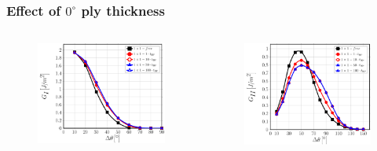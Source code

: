 \documentclass[first,firstsupp,lastsupp,last,hyperref,table]{ETHclass}
\begin{document}
\addtocounter{framenumber}{-1}

\begin{frame}
\frametitle{\vspace{0.2cm}\small Effect of $0^{\circ}$ ply thickness}
\vspace{-.75cm}
\centering
\begin{columns}[c]
\centering
\begin{column}{0.5\textwidth}
\centering
\begin{figure}
\centering
\includegraphics[width=\columnwidth]{1x1-i-vf60-GI-free.pdf}
\end{figure}
\end{column}
\begin{column}{0.5\textwidth}
\centering
\begin{figure}
\centering
\includegraphics[width=\columnwidth]{1x1-i-vf60-GII-free.pdf}

\end{figure}
\end{column}
\end{columns}
\end{frame}
\end{document}
